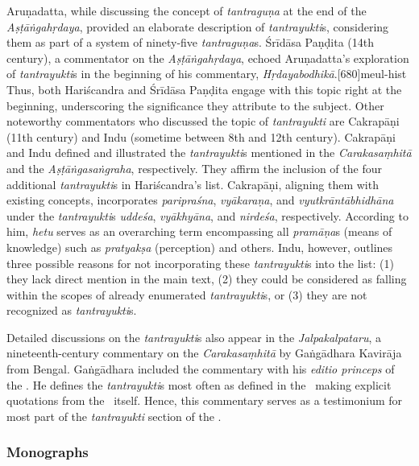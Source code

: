 Aruṇadatta, while discussing the concept of \emph{tantraguṇa} at the end of the 
\emph{Aṣṭāṅgahṛdaya}, 
provided an elaborate description of \emph{tantrayukti}s, 
considering them as part of a system of ninety-five \emph{tantraguṇa}s. 
Śrīdāsa Paṇḍita (14th century), a commentator on the \emph{Aṣṭāṅgahṛdaya}, 
echoed Aruṇadatta's exploration of \emph{tantrayukti}s 
in the beginning of his commentary, 
\emph{Hṛdayabodhikā}.[680]{meul-hist} 
Thus, both Hariścandra and Śrīdāsa Paṇḍita engage with this topic right at the 
beginning, 
underscoring the significance they attribute to the subject. 
Other noteworthy commentators who discussed the topic of \emph{tantrayukti} 
are Cakrapāṇi (11th century) 
and Indu (sometime between 8th and 12th century). 
Cakrapāṇi and Indu defined and illustrated the \emph{tantrayukti}s 
mentioned in the \emph{Carakasaṃhitā} and the \emph{Aṣṭāṅgasaṅgraha}, 
respectively. 
They affirm the inclusion of the four additional \emph{tantrayukti}s in 
Hariścandra's list. 
Cakrapāṇi, aligning them with existing concepts, 
incorporates \emph{paripraśna}, \emph{vyākaraṇa}, 
and \emph{vyutkrāntābhidhāna} under the \emph{tantrayukti}s 
\emph{uddeśa}, 
\emph{vyākhyāna}, and \emph{nirdeśa}, respectively. 
According to him, \emph{hetu} serves as an overarching term 
encompassing all \emph{pramāṇa}s (means of knowledge) 
such as \emph{pratyakṣa} (perception) and others. 
Indu, however, outlines three possible reasons 
for not incorporating these \emph{tantrayukti}s into the list: 
(1) they lack direct mention in the main text, 
(2) they could be considered as falling within the scopes of already enumerated 
\emph{tantrayukti}s, or 
(3) they are not recognized as \emph{tantrayukti}s. 

Detailed discussions on the \emph{tantrayukti}s also appear 
in the \emph{Jalpakalpataru}, a nineteenth-century commentary 
on the \emph{Carakasaṃhitā} by Gaṅgādhara Kavirāja from Bengal.
Gaṅgādhara included the commentary with his \emph{editio princeps} of the 
\CS. 
He defines the \emph{tantrayukti}s most often as defined in the \SS\ 
making explicit quotations from the \SS\ itself.
Hence, this commentary serves as a testimonium for most part 
of the \emph{tantrayukti} section of the \SS. 

\subsubsection{Monographs}

